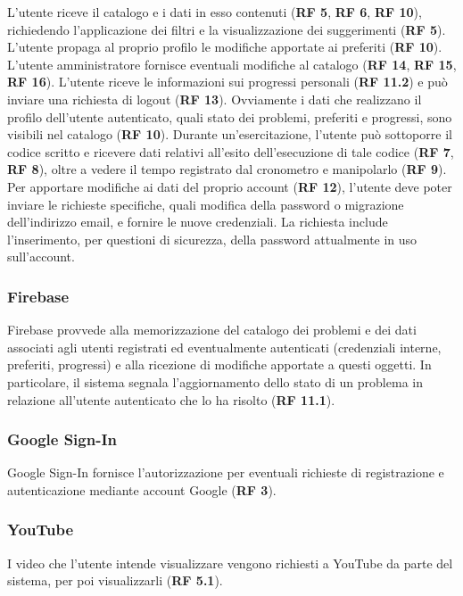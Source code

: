\documentclass[11pt, a4paper]{article}
\theoremstyle{definition} %
\begin{document}
L'utente riceve il catalogo e i dati in esso contenuti (\textbf{RF 5}, \textbf{RF 6},
\textbf{RF 10}), richiedendo l'applicazione dei filtri e la visualizzazione dei
suggerimenti (\textbf{RF 5}). L'utente propaga al proprio profilo le modifiche
apportate ai preferiti (\textbf{RF 10}). L'utente amministratore fornisce
eventuali modifiche al catalogo (\textbf{RF 14}, \textbf{RF 15}, \textbf{RF 16}).
L'utente riceve le informazioni sui progressi personali (\textbf{RF 11.2})
e può inviare una richiesta di logout (\textbf{RF 13}). Ovviamente
i dati che realizzano il profilo dell'utente autenticato, quali stato dei problemi,
preferiti e progressi, sono visibili nel catalogo (\textbf{RF 10}).
Durante un'esercitazione, l'utente può sottoporre il codice scritto e ricevere dati
relativi all'esito dell'esecuzione di tale codice (\textbf{RF 7}, \textbf{RF 8}),
oltre a vedere il tempo registrato dal cronometro e manipolarlo (\textbf{RF 9}).
Per apportare modifiche ai dati del proprio account (\textbf{RF 12}), l'utente
deve poter inviare le richieste specifiche, quali modifica della password
o migrazione dell'indirizzo email, e fornire le nuove credenziali. La
richiesta include l'inserimento, per questioni di sicurezza, della password
attualmente in uso sull'account.

\subsubsection*{Firebase}
Firebase provvede alla memorizzazione del catalogo dei problemi e dei
dati associati agli utenti registrati ed eventualmente autenticati (credenziali
interne, preferiti, progressi) e alla ricezione di modifiche apportate a questi oggetti.
In particolare, il sistema segnala l'aggiornamento dello stato di un problema
in relazione all'utente autenticato che lo ha risolto (\textbf{RF 11.1}).

\subsubsection*{Google Sign-In}
Google Sign-In fornisce l'autorizzazione per eventuali richieste di
registrazione e autenticazione mediante account Google (\textbf{RF 3}).

\subsubsection*{YouTube}
I video che l'utente intende visualizzare vengono richiesti a YouTube da
parte del sistema, per poi visualizzarli (\textbf{RF 5.1}).
\end{document}
